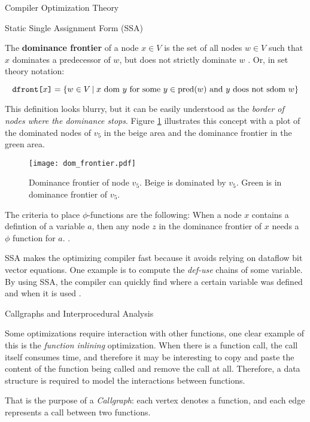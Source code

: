 \begin{section}{Compiler Optimization Theory}
\begin{subsection}{Static Single Assignment Form (SSA)}
\begin{definition}
	The \textbf{dominance frontier} of a node $x \in V$ is the set of all nodes $w \in V$
	such that $x$ dominates a predecessor of $w$, but does not strictly dominate $w$ \citep{appel2004modern}.
	Or, in set theory notation:
\end{definition}
\vspace*{-1cm}
	$$\texttt{dfront[}x\texttt{]} = \{w \in V\,|\;x \text{ dom } y \text{ for some } y \in \text{pred}(w) \text{ and } y \text{ does not sdom } w\}$$

This definition looks blurry, but it can be easily understood as the
\textit{border of nodes where the dominance stops}.  Figure
\ref{fig:dom_frontier} illustrates this concept with a plot of the dominated
nodes of $v_5$ in the beige area and the dominance frontier in the green area.

\begin{figure}[ht]
 \centering
 \texttt{[image: dom\_frontier.pdf]}
 \caption{Dominance frontier of node $v_5$. Beige is dominated by $v_5$. Green is in dominance frontier of $v_5$.}
 \label{fig:dom_frontier}
\end{figure}

The criteria to place $\phi$-functions are the following: When a node $x$ contains a defintion
of a variable $a$, then any node $z$ in the dominance frontier of $x$ needs a $\phi$ function
for $a$. \citep{appel2004modern}.

SSA makes the optimizing compiler fast because it avoids relying on dataflow
bit vector equations. One example is to compute the \textit{def-use} chains
of some variable. By using SSA, the compiler can quickly find where a certain
variable was defined and when it is used \citep{appel2004modern}.

\end{subsection}

\begin{subsection}{Callgraphs and Interprocedural Analysis}

Some optimizations require interaction with other functions, one clear example
of this is the \textit{function inlining} optimization. When there is a
function call, the call itself consumes time, and therefore it may be
interesting to copy and paste the content of the function being called and
remove the call at all.  Therefore, a data structure is required to model the
interactions between functions.

That is the purpose of a \textit{Callgraph}: each vertex denotes a function,
and each edge represents a call between two functions. 


\end{subsection}
\end{section}
